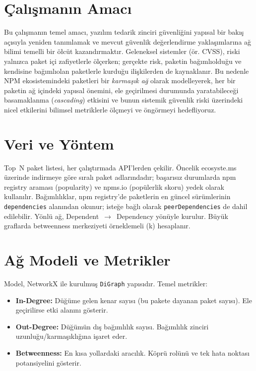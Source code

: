 \documentclass[11pt,a4paper]{article}
\begin{document}
\section{\c{C}al\i\c{s}man\i n Amac\i}
Bu \c{c}al\i\c{s}man\i n temel amac\i, yaz\i l\i m tedarik zinciri g\"uvenli\u{g}ini yap\i sal bir bak\i\c{s} a\c{c}\i s\i yla yeniden tan\i mlamak ve mevcut g\"uvenlik de\u{g}erlendirme yakla\c{s}\i mlar\i na a\u{g} bilimi temelli bir \"o\l c\"ut kazand\i rmakt\i r. Geleneksel sistemler (\"or. CVSS), riski yaln\i zca paket i\c{c}i zafiyetlerle \"ol\c{c}erken; ger\c{c}ekte risk, paketin ba\u{g}\i ml\i oldu\u{g}u ve kendisine ba\u{g}\i ml\i olan paketlerle kurdu\u{g}u ili\c{s}kilerden de kaynaklan\i r. Bu nedenle NPM ekosistemindeki paketleri bir \emph{karma\c{s}\i k a\u{g}} olarak modelleyerek, her bir paketin a\u{g} i\c{c}indeki yap\i sal \"onemini, ele ge\c{c}irilmesi durumunda yaratabilece\u{g}i basamaklanma (\emph{cascading}) etkisini ve bunun sistemik g\"uvenlik riski \"uzerindeki nicel etkilerini bilimsel metriklerle \"ol\c{c}meyi ve \"ong\"ormeyi hedefliyoruz.


\section{Veri ve Yöntem}
Top~N paket listesi, her çalıştırmada API'lerden çekilir. Öncelik ecosyste.ms üzerinde indirmeye göre sıralı paket adlarındadır; başarısız durumlarda npm registry araması (popularity) ve npms.io (popülerlik skoru) yedek olarak kullanılır. Bağımlılıklar, npm registry'de paketlerin en güncel sürümlerinin \texttt{dependencies} alanından okunur; isteğe bağlı olarak \texttt{peerDependencies} de dahil edilebilir. Yönlü ağ, Dependent~$\to$~Dependency yönüyle kurulur. Büyük graflarda betweenness merkeziyeti örneklemeli (k) hesaplanır.

\section{Ağ Modeli ve Metrikler}
Model, NetworkX ile kurulmuş \texttt{DiGraph} yapısıdır. Temel metrikler:
\begin{itemize}
  \item \textbf{In-Degree:} Düğüme gelen kenar sayısı (bu pakete dayanan paket sayısı). Ele geçirilirse etki alanını gösterir.
  \item \textbf{Out-Degree:} Düğümün dış bağımlılık sayısı. Bağımlılık zinciri uzunluğu/karmaşıklığına işaret eder.
  \item \textbf{Betweenness:} En kısa yollardaki aracılık. Köprü rolünü ve tek hata noktası potansiyelini gösterir.
\end{itemize}
\end{document}
